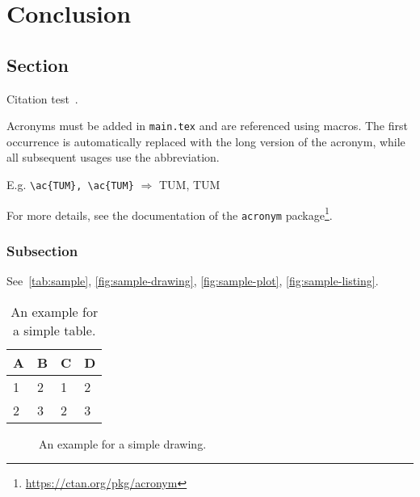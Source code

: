 
\chapter{Conclusion}\label{chapter:conclusion}

\section{Section}
Citation test~\parencite{latex}.

Acronyms must be added in \texttt{main.tex} and are referenced using macros. The first occurrence is automatically replaced with the long version of the acronym, while all subsequent usages use the abbreviation.

E.g. \texttt{\textbackslash ac\{TUM\}, \textbackslash ac\{TUM\}} $\Rightarrow$ \ac{TUM}, \ac{TUM}

For more details, see the documentation of the \texttt{acronym} package\footnote{\url{https://ctan.org/pkg/acronym}}.
\subsection{Subsection}

See~\autoref{tab:sample}, \autoref{fig:sample-drawing}, \autoref{fig:sample-plot}, \autoref{fig:sample-listing}.

\begin{table}[htpb]
  \caption[Example table]{An example for a simple table.}\label{tab:sample}
  \centering
  \begin{tabular}{l l l l}
    \toprule
      A & B & C & D \\
    \midrule
      1 & 2 & 1 & 2 \\
      2 & 3 & 2 & 3 \\
    \bottomrule
  \end{tabular}
\end{table}

\begin{figure}[htpb]
  \centering
  \caption[Example drawing]{An example for a simple drawing.}\label{fig:sample-drawing}
\end{figure}


